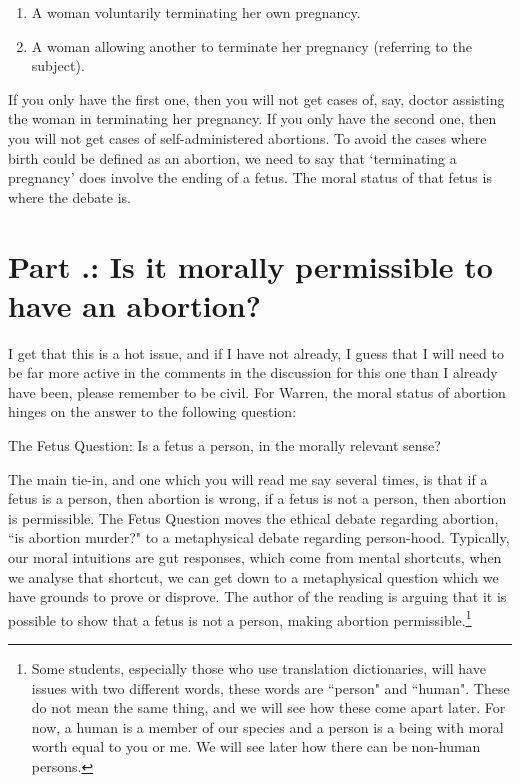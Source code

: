 \begin{enumerate}
\item A woman voluntarily terminating her own pregnancy.  	
\item A woman allowing another to terminate her pregnancy (referring to the subject).
\end{enumerate}
If you only have the first one, then you will not get cases of, say, doctor assisting the woman in terminating her pregnancy. If you only have the second one, then you will not get cases of self-administered abortions.  To avoid the cases where birth could be defined as an abortion, we need to say that `terminating a pregnancy' does involve the ending of a fetus. The moral status of that fetus is where the debate is.  

\section{Part \thechapcount.\theseccount: Is it morally permissible to have an abortion?}

I get that this is a hot issue, and if I have not already, I guess that I will need to be far more active in the comments in the discussion for this one than I already have been, please remember to be civil. For Warren, the moral status of abortion hinges on the answer to the following question:

\begin{center}
The Fetus Question: Is a fetus a person, in the morally relevant sense?
\end{center}

The main tie-in, and one which you will read me say several times, is that if a fetus is a person, then abortion is wrong, if a fetus is not a person, then abortion is permissible. The Fetus Question moves the ethical debate regarding abortion, ``is abortion murder?" to a metaphysical debate regarding person-hood. Typically, our moral intuitions are gut responses, which come from mental shortcuts, when we analyse that shortcut, we can get down to a metaphysical question which we have grounds to prove or disprove. The author of the reading is arguing that it is possible to show that a fetus is not a person, making abortion permissible.\footnote{Some students, especially those who use translation dictionaries, will have issues with two different words, these words are ``person" and ``human". These do not mean the same thing, and we will see how these come apart later. For now, a human is a member of our species and a person is a being with moral worth equal to you or me. We will see later how there can be non-human persons.} 

